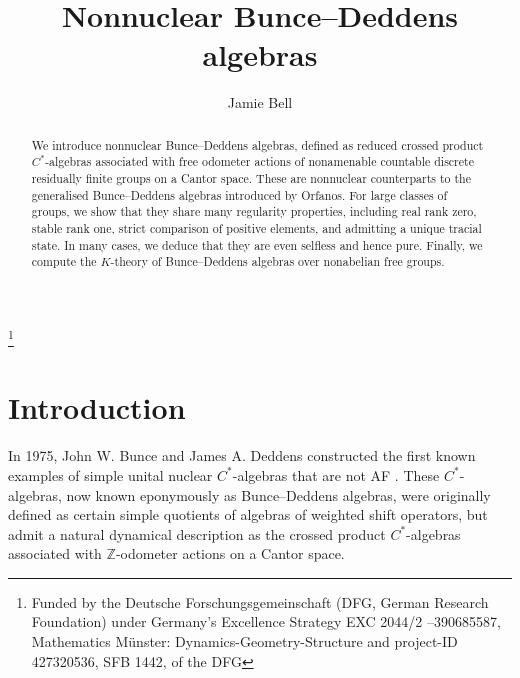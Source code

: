 \documentclass[11pt,a4,leqno]{amsart}
\theoremstyle{definition}
\theoremstyle{remark}
\numberwithin{equation}{section}
\theoremstyle{plain}
\newcommand{\Zb}{\mathbb{Z}}
\begin{document}
      
\begin{abstract}
    We introduce nonnuclear Bunce--Deddens algebras, defined as reduced crossed product $C^*$-algebras associated with free odometer actions of nonamenable countable discrete residually finite groups on a Cantor space. These are nonnuclear counterparts to the generalised Bunce--Deddens algebras introduced by Orfanos. For large classes of groups, we show that they share many regularity properties, including real rank zero, stable rank one, strict comparison of positive elements, and admitting a unique tracial state. In many cases, we deduce that they are even selfless and hence pure. Finally, we compute the $K$-theory of Bunce--Deddens algebras over nonabelian free groups.
\end{abstract}


 
\title{Nonnuclear Bunce--Deddens algebras}
\author{Jamie Bell}
\address{Jamie Bell, Mathematical Institute, University of M\"unster, Einsteinstrasse 62, 48149 M\"unster, Germany.}

\thanks{Funded by the Deutsche Forschungsgemeinschaft (DFG, German Research Foundation) under Germany's Excellence Strategy EXC 2044/2 –390685587, Mathematics M\"unster: Dynamics-Geometry-Structure and project-ID 427320536, SFB 1442, of the DFG}

\maketitle

\section{Introduction}

In 1975, John W. Bunce and James A. Deddens constructed the first known examples of simple unital nuclear $C^*$-algebras that are not AF \cite{BunDed75}. These $C^*$-algebras, now known eponymously as Bunce--Deddens algebras, were originally defined as certain simple quotients of algebras of weighted shift operators, but admit a natural dynamical description as the crossed product $C^*$-algebras associated with $\Zb$-odometer actions on a Cantor space. 
\end{document}
